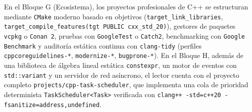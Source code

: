 \documentclass{book}
\begin{document}
En el Bloque G (Ecosistema), los proyectos profesionales de C++ se estructuran mediante \texttt{CMake} moderno basado en objetivos (\texttt{target\_link\_libraries}, \texttt{target\_compile\_features(tgt PUBLIC cxx\_std\_20)}), gestores de paquetes \texttt{vcpkg} o \texttt{Conan 2}, pruebas con \texttt{GoogleTest} o \texttt{Catch2}, benchmarking con \texttt{Google Benchmark} y auditoría estática continua con \texttt{clang-tidy} (perfiles \texttt{cppcoreguidelines-*}, \texttt{modernize-*}, \texttt{bugprone-*}). En el Bloque H, además de una biblioteca de álgebra lineal estática \texttt{constexpr}, un motor de eventos con \texttt{std::variant} y un servidor de red asíncrono, el lector cuenta con el proyecto completo \texttt{projects/cpp-task-scheduler}, que implementa una cola de prioridad determinista \texttt{TaskScheduler<Task>} verificada con \texttt{clang++ -std=c++20 -fsanitize=address,undefined}.
\end{document}
